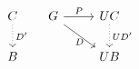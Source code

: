 \begin{figure}[H]
\centering

\[ \begin{array}{cc}
\begin{tikzcd}
	C \arrow[d, dotted, "D'"]\\
	B
\end{tikzcd}

&

\begin{tikzcd}
	G \arrow[r, "P"] \arrow[dr, "D" below] & UC \arrow[d, dotted, "UD'"]\\
								 		   & UB
\end{tikzcd}
\end{array} \]

\end{figure}
